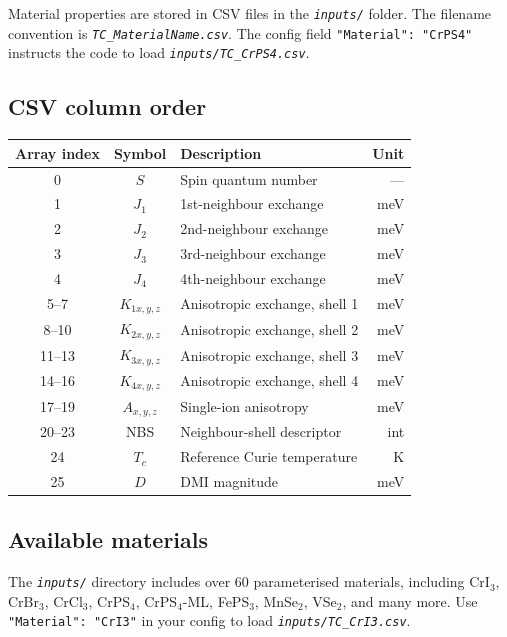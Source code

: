 \documentclass[12pt,a4paper]{article}
\newcommand{\code}[1]{\texttt{#1}}
\newcommand{\file}[1]{\texttt{\textit{#1}}}
\begin{document}
Material properties are stored in CSV files in the \file{inputs/} folder. The
filename convention is \file{TC\_MaterialName.csv}. The config field
\code{"Material": "CrPS4"} instructs the code to load
\file{inputs/TC\_CrPS4.csv}.

\subsection{CSV column order}

\begin{center}
\begin{tabular}{cclr}
\toprule
\textbf{Array index} & \textbf{Symbol} & \textbf{Description} & \textbf{Unit} \\
\midrule
0  & $S$         & Spin quantum number               & --- \\
1  & $J_1$       & 1st-neighbour exchange            & meV \\
2  & $J_2$       & 2nd-neighbour exchange            & meV \\
3  & $J_3$       & 3rd-neighbour exchange            & meV \\
4  & $J_4$       & 4th-neighbour exchange            & meV \\
5--7  & $K_{1x,y,z}$ & Anisotropic exchange, shell 1 & meV \\
8--10 & $K_{2x,y,z}$ & Anisotropic exchange, shell 2 & meV \\
11--13 & $K_{3x,y,z}$ & Anisotropic exchange, shell 3 & meV \\
14--16 & $K_{4x,y,z}$ & Anisotropic exchange, shell 4 & meV \\
17--19 & $A_{x,y,z}$ & Single-ion anisotropy         & meV \\
20--23 & NBS       & Neighbour-shell descriptor        & int \\
24 & $T_c$        & Reference Curie temperature        & K \\
25 & $D$          & DMI magnitude                     & meV \\
\bottomrule
\end{tabular}
\end{center}

\subsection{Available materials}

The \file{inputs/} directory includes over 60 parameterised materials, including
CrI$_3$, CrBr$_3$, CrCl$_3$, CrPS$_4$, CrPS$_4$-ML, FePS$_3$, MnSe$_2$,
VSe$_2$, and many more. Use \code{"Material": "CrI3"} in your config to load
\file{inputs/TC\_CrI3.csv}.
\end{document}
